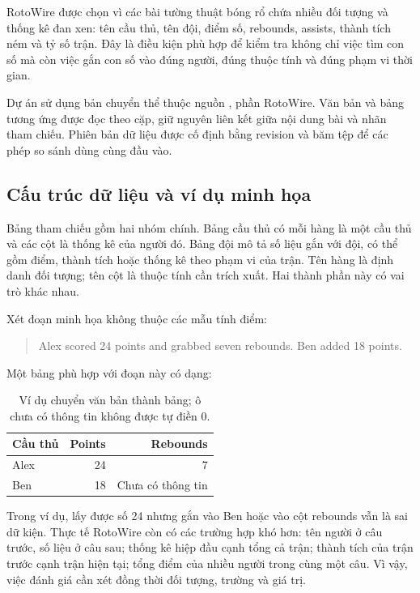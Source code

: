RotoWire được chọn vì các bài tường thuật bóng rổ chứa nhiều đối tượng và thống kê đan xen: tên cầu thủ, tên đội, điểm số, rebounds, assists, thành tích ném và tỷ số trận. Đây là điều kiện phù hợp để kiểm tra không chỉ việc tìm con số mà còn việc gắn con số vào đúng người, đúng thuộc tính và đúng phạm vi thời gian.

Dự án sử dụng bản chuyển thể thuộc nguồn , phần RotoWire. Văn bản và bảng tương ứng được đọc theo cặp, giữ nguyên liên kết giữa nội dung bài và nhãn tham chiếu. Phiên bản dữ liệu được cố định bằng revision và băm tệp để các phép so sánh dùng cùng đầu vào.

\subsection{Cấu trúc dữ liệu và ví dụ minh họa}
Bảng tham chiếu gồm hai nhóm chính. Bảng cầu thủ có mỗi hàng là một cầu thủ và các cột là thống kê của người đó. Bảng đội mô tả số liệu gắn với đội, có thể gồm điểm, thành tích hoặc thống kê theo phạm vi của trận. Tên hàng là định danh đối tượng; tên cột là thuộc tính cần trích xuất. Hai thành phần này có vai trò khác nhau.

Xét đoạn minh họa không thuộc các mẫu tính điểm:
\begin{quote}
Alex scored 24 points and grabbed seven rebounds. Ben added 18 points.
\end{quote}
Một bảng phù hợp với đoạn này có dạng:
\begin{table}[H]
\centering
\begin{tabular}{@{}lrr@{}}
\toprule\textbf{Cầu thủ} & \textbf{Points} & \textbf{Rebounds}\\\midrule
Alex & 24 & 7\\
Ben & 18 & Chưa có thông tin\\
\bottomrule
\end{tabular}
\caption{Ví dụ chuyển văn bản thành bảng; ô chưa có thông tin không được tự điền 0.}
\end{table}

Trong ví dụ, lấy được số 24 nhưng gắn vào Ben hoặc vào cột rebounds vẫn là sai dữ kiện. Thực tế RotoWire còn có các trường hợp khó hơn: tên người ở câu trước, số liệu ở câu sau; thống kê hiệp đầu cạnh tổng cả trận; thành tích của trận trước cạnh trận hiện tại; tổng điểm của nhiều người trong cùng một câu. Vì vậy, việc đánh giá cần xét đồng thời đối tượng, trường và giá trị.

